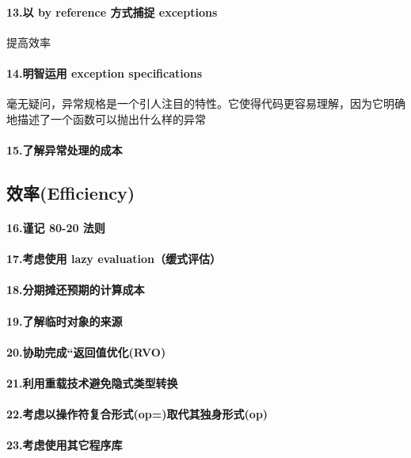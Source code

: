 \documentclass[UTF8,a4paper,12pt]{ctexbook}
\begin{document}
			\paragraph{13.以 by reference 方式捕捉 exceptions} 提高效率
			
			\paragraph{14.明智运用 exception specifications} 毫无疑问，异常规格是一个引人注目的特性。它使得代码更容易理解，因为它明确地描述了一个函数可以抛出什么样的异常
			\paragraph{15.了解异常处理的成本}
			
		\subsection{效率(Efficiency)}
			\paragraph{16.谨记 80-20 法则}
			\paragraph{17.考虑使用 lazy evaluation（缓式评估）}
			\paragraph{18.分期摊还预期的计算成本}
			\paragraph{19.了解临时对象的来源}
			\paragraph{20.协助完成“返回值优化(RVO)}
			\paragraph{21.利用重载技术避免隐式类型转换}
			\paragraph{22.考虑以操作符复合形式(op=)取代其独身形式(op)}
			\paragraph{23.考虑使用其它程序库}
\end{document}
